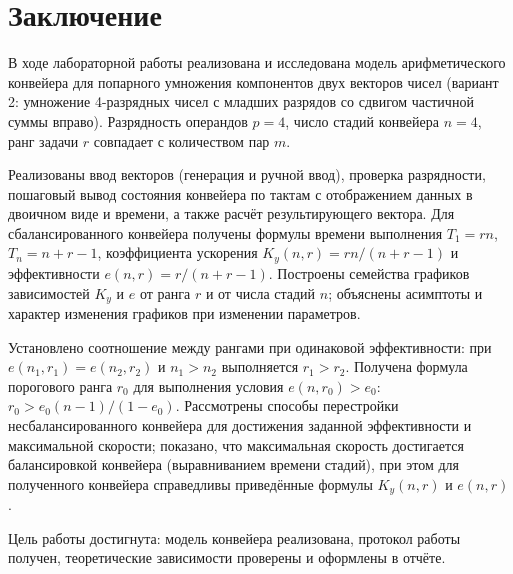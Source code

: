 \section*{Заключение}

В ходе лабораторной работы реализована и исследована модель арифметического конвейера для попарного умножения компонентов двух векторов чисел (вариант 2: умножение 4-разрядных чисел с младших разрядов со сдвигом частичной суммы вправо). Разрядность операндов $p = 4$, число стадий конвейера $n = 4$, ранг задачи $r$ совпадает с количеством пар $m$.

Реализованы ввод векторов (генерация и ручной ввод), проверка разрядности, пошаговый вывод состояния конвейера по тактам с отображением данных в двоичном виде и времени, а также расчёт результирующего вектора. Для сбалансированного конвейера получены формулы времени выполнения $T_1 = r n$, $T_n = n + r - 1$, коэффициента ускорения $K_y(n, r) = r n / (n + r - 1)$ и эффективности $e(n, r) = r / (n + r - 1)$. Построены семейства графиков зависимостей $K_y$ и $e$ от ранга $r$ и от числа стадий $n$; объяснены асимптоты и характер изменения графиков при изменении параметров.

Установлено соотношение между рангами при одинаковой эффективности: при $e(n_1, r_1) = e(n_2, r_2)$ и $n_1 > n_2$ выполняется $r_1 > r_2$. Получена формула порогового ранга $r_0$ для выполнения условия $e(n, r_0) > e_0$: $r_0 > e_0(n - 1) / (1 - e_0)$. Рассмотрены способы перестройки несбалансированного конвейера для достижения заданной эффективности и максимальной скорости; показано, что максимальная скорость достигается балансировкой конвейера (выравниванием времени стадий), при этом для полученного конвейера справедливы приведённые формулы $K_y(n, r)$ и $e(n, r)$.

Цель работы достигнута: модель конвейера реализована, протокол работы получен, теоретические зависимости проверены и оформлены в отчёте.
